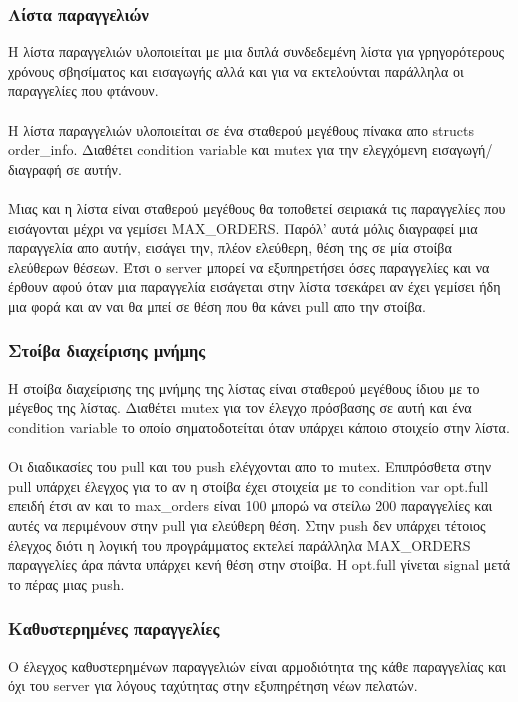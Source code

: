 \documentclass{article}
\begin{document}
\subsubsection{Λίστα παραγγελιών}
\label{list_info}
Η λίστα παραγγελιών υλοποιείται με μια διπλά συνδεδεμένη λίστα για γρηγορότερους χρόνους σβησίματος και εισαγωγής αλλά και για να εκτελούνται παράλληλα οι παραγγελίες που φτάνουν.
\paragraph{}
Η λίστα παραγγελιών υλοποιείται σε ένα σταθερού μεγέθους πίνακα απο structs order\_info. Διαθέτει condition variable και mutex για την ελεγχόμενη εισαγωγή/διαγραφή σε αυτήν.
\paragraph{}
Μιας και η λίστα είναι σταθερού μεγέθους θα τοποθετεί σειριακά τις παραγγελίες που εισάγονται μέχρι να γεμίσει MAX\_ORDERS. Παρόλ' αυτά μόλις διαγραφεί μια παραγγελία απο αυτήν, εισάγει την, πλέον ελεύθερη, θέση της σε μία στοίβα ελεύθερων θέσεων. Έτσι ο server μπορεί να εξυπηρετήσει όσες παραγγελίες και να έρθουν αφού όταν μια παραγγελία εισάγεται στην λίστα τσεκάρει αν έχει γεμίσει ήδη μια φορά και αν ναι θα μπεί σε θέση που θα κάνει pull απο την στοίβα.

\subsubsection{Στοίβα διαχείρισης μνήμης}
\label{stack}
Η στοίβα διαχείρισης της μνήμης της λίστας είναι σταθερού μεγέθους ίδιου με το μέγεθος της λίστας. Διαθέτει mutex για τον έλεγχο πρόσβασης σε αυτή και ένα condition variable το οποίο σηματοδοτείται όταν υπάρχει κάποιο στοιχείο στην λίστα.
\paragraph{}
Οι διαδικασίες του pull και του push ελέγχονται απο το mutex.
Επιπρόσθετα στην pull υπάρχει έλεγχος για το αν η στοίβα έχει στοιχεία
με το condition var opt.full επειδή έτσι αν και το max\_orders είναι 100 μπορώ να στείλω 200 παραγγελίες και αυτές να περιμένουν στην pull για ελεύθερη θέση.
Στην push δεν υπάρχει τέτοιος έλεγχος διότι η λογική του προγράμματος εκτελεί παράλληλα MAX\_ORDERS παραγγελίες άρα πάντα υπάρχει κενή θέση στην στοίβα. Η opt.full γίνεται signal μετά το πέρας μιας push.

\subsubsection{Καθυστερημένες παραγγελίες}
\label{late}
Ο έλεγχος καθυστερημένων παραγγελιών είναι αρμοδιότητα της κάθε παραγγελίας και όχι του server για λόγους ταχύτητας στην εξυπηρέτηση νέων πελατών.
\end{document}
